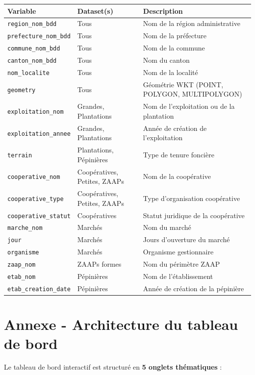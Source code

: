 \documentclass[12pt, a4paper]{article}
\begin{document}
\begin{longtable}{p{4cm} p{4cm} p{6.5cm}}
\toprule
\textbf{Variable} & \textbf{Dataset(s)} & \textbf{Description} \\
\midrule
\endhead
\texttt{region\_nom\_bdd} & Tous & Nom de la région administrative \\
\texttt{prefecture\_nom\_bdd} & Tous & Nom de la préfecture \\
\texttt{commune\_nom\_bdd} & Tous & Nom de la commune \\
\texttt{canton\_nom\_bdd} & Tous & Nom du canton \\
\texttt{nom\_localite} & Tous & Nom de la localité \\
\texttt{geometry} & Tous & Géométrie WKT (POINT, POLYGON, MULTIPOLYGON) \\
\texttt{exploitation\_nom} & Grandes, Plantations & Nom de l'exploitation ou de la plantation \\
\texttt{exploitation\_annee} & Grandes, Plantations & Année de création de l'exploitation \\
\texttt{terrain} & Plantations, Pépinières & Type de tenure foncière \\
\texttt{cooperative\_nom} & Coopératives, Petites, ZAAPs & Nom de la coopérative \\
\texttt{cooperative\_type} & Coopératives, Petites, ZAAPs & Type d'organisation coopérative \\
\texttt{cooperative\_statut} & Coopératives & Statut juridique de la coopérative \\
\texttt{marche\_nom} & Marchés & Nom du marché \\
\texttt{jour} & Marchés & Jours d'ouverture du marché \\
\texttt{organisme} & Marchés & Organisme gestionnaire \\
\texttt{zaap\_nom} & ZAAPs formes & Nom du périmètre ZAAP \\
\texttt{etab\_nom} & Pépinières & Nom de l'établissement \\
\texttt{etab\_creation\_date} & Pépinières & Année de création de la pépinière \\
\bottomrule
\end{longtable}

\section{Annexe - Architecture du tableau de bord}

Le tableau de bord interactif est structuré en \textbf{5 onglets thématiques} :
\end{document}
